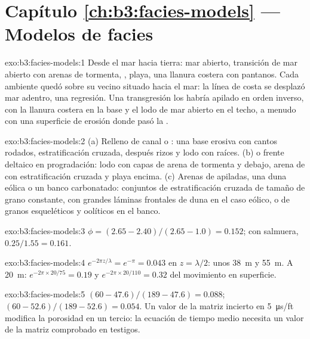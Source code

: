 \section*{Capítulo \ref{ch:b3:facies-models} --- Modelos de facies}

\begin{solution}{exo:b3:facies-models:1}
Desde el mar hacia tierra: mar abierto, transición de mar abierto con arenas de tormenta,
, playa, una llanura costera con pantanos. Cada ambiente quedó sobre su vecino
situado hacia el mar: la línea de costa se desplazó mar adentro, una regresión. Una transgresión los
habría apilado en orden inverso, con la llanura costera en la base y el lodo de mar abierto en el techo,
a menudo con una superficie de erosión donde pasó la
.
\end{solution}

\begin{solution}{exo:b3:facies-models:2}
(a) Relleno de canal o : una base erosiva con cantos rodados, estratificación cruzada,
después rizos y lodo con raíces. (b)  o frente deltaico en progradación:
lodo con capas de arena de tormenta y  debajo,
arena de  con estratificación cruzada y playa encima. (c) Arenas de  apiladas,
una duna eólica o un banco carbonatado: conjuntos de estratificación cruzada de tamaño de grano constante,
con grandes láminas frontales de duna en el caso eólico, o de granos
esqueléticos y oolíticos en el banco.
\end{solution}

\begin{solution}{exo:b3:facies-models:3}
$\phi = (2.65 - 2.40)/(2.65 - 1.0) = 0.152$; con salmuera,
$0.25/1.55 = 0.161$.
\end{solution}

\begin{solution}{exo:b3:facies-models:4}
$e^{-2\pi z/\lambda} = e^{-\pi} = 0.043$ en $z = \lambda/2$: unos
\qty{38}{m} y \qty{55}{m}. A \qty{20}{m}: $e^{-2\pi\times20/75} = 0.19$
y $e^{-2\pi\times20/110} = 0.32$ del movimiento en superficie.
\end{solution}

\begin{solution}{exo:b3:facies-models:5}
$(60 - 47.6)/(189 - 47.6) = 0.088$; $(60 - 52.6)/(189 - 52.6) = 0.054$. Un
valor de la matriz incierto en \qty{5}{\micro\second/ft} modifica la porosidad en
un tercio: la ecuación de tiempo medio necesita un valor de la matriz comprobado en testigos.
\end{solution}

